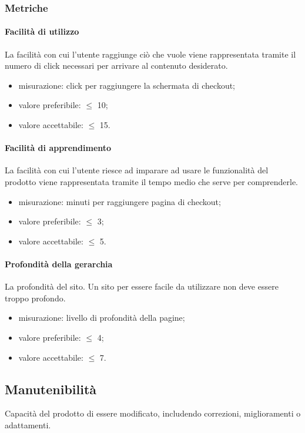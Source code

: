 		\subsubsection{Metriche}
			\paragraph{Facilità di utilizzo}
			La facilità con cui l'utente raggiunge ciò che vuole viene rappresentata tramite il numero di click necessari per arrivare al contenuto desiderato.
			\begin{itemize}
			\item misurazione: click per raggiungere la schermata di checkout;
			\item valore preferibile: $\leq$ 10;
			\item valore accettabile: $\leq$ 15.
			\end{itemize}
			\paragraph{Facilità di apprendimento}
			La facilità con cui l'utente riesce ad imparare ad usare le funzionalità del prodotto viene rappresentata tramite il tempo medio che serve per comprenderle.
			\begin{itemize}
			\item misurazione: minuti per raggiungere pagina di checkout;
			\item valore preferibile: $\leq$ 3;
			\item valore accettabile: $\leq$ 5.
			\end{itemize}
			\paragraph{Profondità della gerarchia}
			La profondità del sito. Un sito per essere facile da utilizzare non deve essere troppo profondo.
			\begin{itemize}
			\item misurazione: livello di profondità della pagine;
			\item valore preferibile: $\leq$ 4;
			\item valore accettabile: $\leq$ 7.
			\end{itemize}
	\subsection{Manutenibilità}
	Capacità del prodotto di essere modificato, includendo correzioni, miglioramenti o adattamenti.
